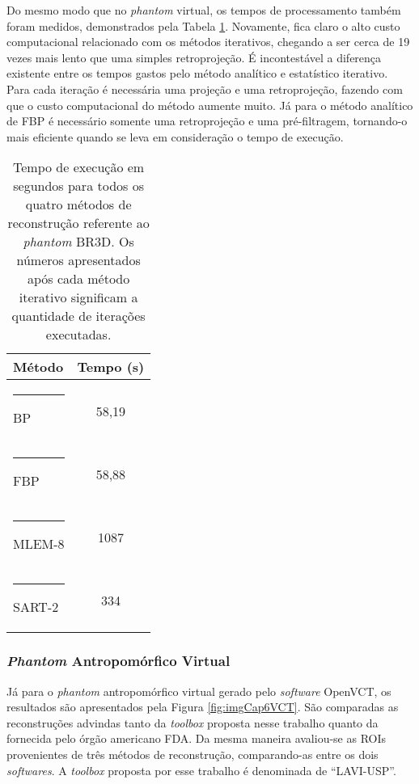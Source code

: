 Do mesmo modo que no \textit{phantom} virtual, os tempos de processamento também foram medidos, demonstrados pela Tabela \ref{tab:tabCap6TimeBR3D}. Novamente, fica claro o alto custo computacional relacionado com os métodos iterativos, chegando  a ser cerca de 19 vezes mais lento que uma simples retroprojeção.  É incontestável a diferença existente entre os tempos gastos pelo método analítico e estatístico iterativo. Para cada iteração é necessária uma projeção e uma retroprojeção, fazendo com que o custo computacional do método aumente muito. Já para o método analítico de \acs{FBP} é necessário somente uma retroprojeção e uma pré-filtragem, tornando-o mais eficiente quando se leva em consideração o tempo de execução.

\begin{table}[!ht]
	\centering
	\caption{Tempo de execução em segundos para todos os quatro métodos de reconstrução referente ao \textit{phantom} BR3D. Os números apresentados após cada método iterativo significam a quantidade de iterações executadas.}
	\label{tab:tabCap6TimeBR3D}
	\begin{tabular}{l|c}
		\textbf{Método}	     &   \textbf{Tempo (s)}   	\\ 
		\hline
		\hline
		\rule[-0.5ex]{-3pt}{3ex}
		BP 	 		 						& 58,19					\\ 
		\hline
		\rule[-0.5ex]{-3pt}{3ex}
		FBP			 						& 58,88					\\
		\hline
		\rule[-0.5ex]{-3pt}{3ex}
		MLEM-8		 					& 1087 					\\
		\hline
		\rule[-0.5ex]{-3pt}{3ex}
		SART-2		 					& 334 					\\
		\hline
	\end{tabular}
	\vspace{2ex}
\end{table}


\subsubsection{\textit{Phantom} Antropomórfico Virtual}
 
 Já para o \textit{phantom} antropomórfico virtual gerado pelo \textit{software} OpenVCT, os resultados são apresentados pela Figura \ref{fig:imgCap6VCT}. São comparadas as reconstruções advindas tanto da \textit{toolbox} proposta nesse trabalho quanto da fornecida pelo órgão americano \acs{FDA}. Da mesma maneira avaliou-se as \acs{ROI}s provenientes de três métodos de reconstrução, comparando-as entre os dois \textit{softwares}. A \textit{toolbox} proposta por esse trabalho é denominada de ``LAVI-USP''.
 
